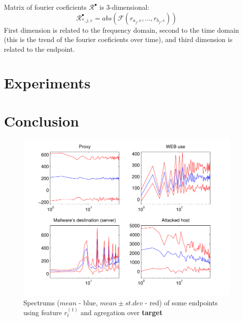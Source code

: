 \documentclass[a4paper]{IEEEtran}
\begin{document}
Matrix of fourier coeficients $\mathcal{R}^\bullet$ is 3-dimensional:
\[
\mathcal{R}^\bullet_{*,j,e} = abs(\mathcal{F}(r_{a_j,e}, ..., r_{b_j,e}))
\]
First dimension is related to the frequency domain, second to the time domain (this is the trend of the fourier coeficients over time), and third dimension is related to the endpoint.


\section{Experiments}

\section{Conclusion}

\onecolumn
\begin{figure}[t!]%
  \centering
  \includegraphics[width=150mm]{spect_dst_bdivp}
  \caption{Spectrums ($mean$ - blue, $mean\pm st.dev$ - red) of some  endpoints using feature $r_t^{(1)}$ and agregation over \textbf{target}}
  \label{fig:spect_dst_bdivp}
\end{figure}
\end{document}
